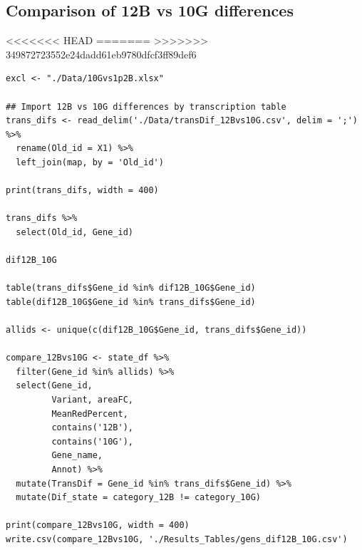 \documentclass[11pt]{article}
\begin{document}
\subsection{Comparison of 12B vs 10G differences}
<<<<<<< HEAD
\label{sec:org00fb2b6}
=======
\label{sec:orgcb3846e}
>>>>>>> 349872723552e24dadd61eb9780dfcf3ff89def6
\begin{verbatim}
excl <- "./Data/10Gvs1p2B.xlsx"

## Import 12B vs 10G differences by transcription table
trans_difs <- read_delim('./Data/transDif_12Bvs10G.csv', delim = ';') %>%
  rename(Old_id = X1) %>%
  left_join(map, by = 'Old_id')

print(trans_difs, width = 400)

trans_difs %>%
  select(Old_id, Gene_id)

dif12B_10G

table(trans_difs$Gene_id %in% dif12B_10G$Gene_id)
table(dif12B_10G$Gene_id %in% trans_difs$Gene_id)

allids <- unique(c(dif12B_10G$Gene_id, trans_difs$Gene_id))

compare_12Bvs10G <- state_df %>%
  filter(Gene_id %in% allids) %>%
  select(Gene_id,
         Variant, areaFC,
         MeanRedPercent,
         contains('12B'),
         contains('10G'),
         Gene_name,
         Annot) %>%
  mutate(TransDif = Gene_id %in% trans_difs$Gene_id) %>%
  mutate(Dif_state = category_12B != category_10G)

print(compare_12Bvs10G, width = 400)
write.csv(compare_12Bvs10G, './Results_Tables/gens_dif12B_10G.csv')
\end{verbatim}
\end{document}
